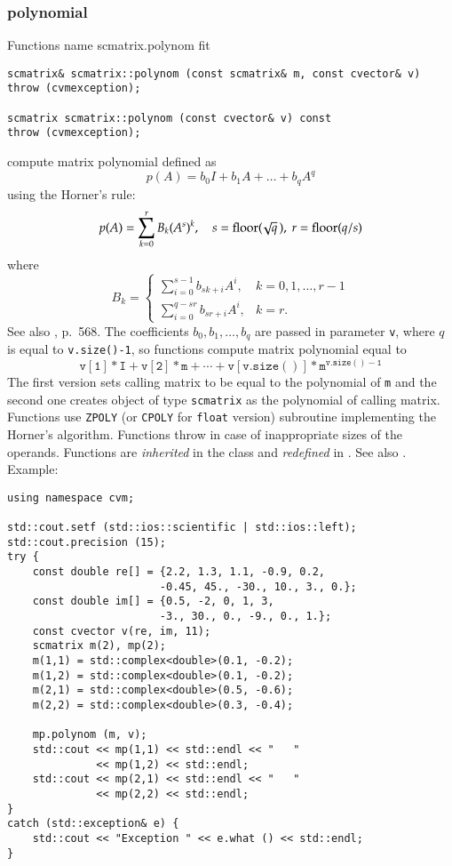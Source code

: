 \subsubsection{polynomial}
Functions%
\pdfdest name {scmatrix.polynom} fit
\begin{verbatim}
scmatrix& scmatrix::polynom (const scmatrix& m, const cvector& v)
throw (cvmexception);

scmatrix scmatrix::polynom (const cvector& v) const
throw (cvmexception);
\end{verbatim}
compute  matrix polynomial defined as
\begin{equation*}
p(A)=b_0I+b_1A+\dots+b_qA^q
\end{equation*}
using the Horner's rule:
\begin{equation*}
p(A)=\sum_{k=0}^r B_k(A^s)^k,\quad s=\operatorname{floor}(\!\sqrt{q}\,),\ r=\operatorname{floor}(q/s)
\end{equation*}
where
\begin{equation*}
B_k=\begin{cases}
\sum\limits_{i=0}^{s-1}b_{sk+i} A^i, & k=0,1,\dots,r-1\\
\sum\limits_{i=0}^{q-sr}b_{sr+i} A^i, & k=r.
\end{cases}
\end{equation*}
See also , p.~568.
The coefficients $b_0,b_1,\dots,b_q$ are passed in  parameter 
\verb"v",
where $q$ is equal to \verb"v.size()-1", so  functions
compute matrix polynomial equal to
\begin{equation*}
\mathtt{v[1]*I + v[2]*m +\cdots + v[v.size()]*m^{v.size()-1}}
\end{equation*}
The first version sets  calling matrix to be equal to the polynomial of
\verb"m"
and the second one
creates  object of type \verb"scmatrix" as the 
polynomial of  calling matrix.
Functions use \verb"ZPOLY" (or \verb"CPOLY" for \verb"float" version)
\FORTRAN subroutine implementing the Horner's algorithm.
Functions throw   
in case of inappropriate sizes of the operands.
Functions are \emph{inherited} in the class
and \emph{redefined} in .
See also
.
Example:
\begin{Verbatim}
using namespace cvm;

std::cout.setf (std::ios::scientific | std::ios::left); 
std::cout.precision (15);
try {
    const double re[] = {2.2, 1.3, 1.1, -0.9, 0.2,
                        -0.45, 45., -30., 10., 3., 0.};
    const double im[] = {0.5, -2, 0, 1, 3,
                        -3., 30., 0., -9., 0., 1.};
    const cvector v(re, im, 11);
    scmatrix m(2), mp(2);
    m(1,1) = std::complex<double>(0.1, -0.2);
    m(1,2) = std::complex<double>(0.1, -0.2);
    m(2,1) = std::complex<double>(0.5, -0.6);
    m(2,2) = std::complex<double>(0.3, -0.4);

    mp.polynom (m, v);
    std::cout << mp(1,1) << std::endl << "   " 
              << mp(1,2) << std::endl;
    std::cout << mp(2,1) << std::endl << "   " 
              << mp(2,2) << std::endl;
}
catch (std::exception& e) {
    std::cout << "Exception " << e.what () << std::endl;
}
\end{Verbatim}
